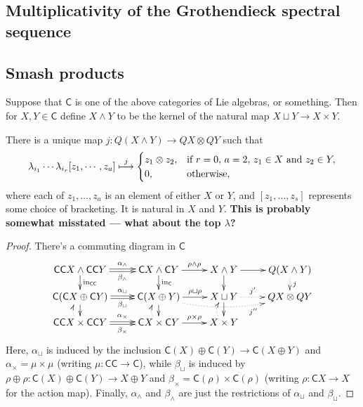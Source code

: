 \documentclass[10pt]{article}
\begin{document}
\begin{Grothendieck Multiplicativity}
\pagebreak
\section{Multiplicativity of the Grothendieck spectral sequence}
\subsection{Smash products}
Suppose that $\mathsf{C}$ is one of the above categories of Lie algebras, or something. Then for $X,Y\in\mathsf{C}$ define $X\wedge Y$ to be the kernel of the natural map $X\sqcup Y\to X\times Y$. 
\begin{prop}
There is a unique map $j:Q(X\wedge Y)\to QX\otimes QY$ such that
\[\lambda_{i_1}\cdots \lambda_{i_r}[z_1,\cdots ,z_a]\overset{j}{\mapsto}\begin{cases}
z_1\otimes z_2,&\textup{if }r=0,\,a=2,\,z_1\in X\textup{ and } z_2\in Y,
\\0,&\textup{otherwise, }
\end{cases}
\]
where each of $z_1,\ldots,z_a$ is an element of either $X$ or $Y$, and $[z_1,\ldots,z_s]$ represents some choice of bracketing. It is natural in $X$ and $Y$. \textbf{This is probably somewhat misstated --- what about the top $\lambda$?}
\end{prop}
\begin{proof}
There's a commuting diagram in $\mathsf{C}$
\[\xymatrix@R=4mm{
\mathsf{C}\mathsf{C}X\wedge \mathsf{C}\mathsf{C}Y
\ar[d]^-{\textup{in}_{\mathsf{C}\mathsf{C}}}
\ar@<.3ex>[r]^-{\alpha_{\wedge }}
\ar@<-.3ex>[r]_-{\beta_{\wedge }}
&%
\mathsf{C}X\wedge \mathsf{C}Y
\ar[d]^-{\textup{in}_{\mathsf{C}}}
\ar[r]^-{\rho\wedge \rho}
&%
X\wedge Y
\ar[d]%
\ar[r]
&
Q(X\wedge Y)
\ar@{..>}[d]^-{j}
\\
\mathsf{C}(\mathsf{C}X\oplus\mathsf{C}Y)
\ar[d]
\ar@<.3ex>[r]^-{\alpha_{\sqcup}}
\ar@<-.3ex>[r]_-{\beta_{\sqcup}}
&%
\mathsf{C}(X\oplus Y)
\ar@{..>}@/_1em/[rr]_-(.85){j''}
\ar[d]
\ar[r]^-{\rho\sqcup \rho}
&%
X\sqcup Y
\ar[d]
\ar@{..>}[r]^-{j'}
&
QX\otimes QY
\\
\mathsf{C}\mathsf{C}X\times \mathsf{C}\mathsf{C}Y
\ar@<.3ex>[r]^-{\alpha_{\times}}
\ar@<-.3ex>[r]_-{\beta_{\times}}
\ar@{..>}@/^.75em/@<0ex>[u]
&%
\mathsf{C}X\times \mathsf{C}Y
\ar[r]^-{\rho\times \rho}
\ar@{..>}@/^.75em/@<0ex>[u]
&%
X\times Y
\ar@{..>}@/^.75em/@<0ex>[u]
}\]
Here, $\alpha_{\sqcup}$ is induced by the inclusion $\mathsf{C}(X)\oplus\mathsf{C}(Y)\to\mathsf{C}(X\oplus Y)$ and $\alpha_{\times}=\mu\times\mu$ (writing $\mu:\mathsf{C}\mathsf{C}\to\mathsf{C}$), while $\beta_{\sqcup}$ is induced by $\rho\oplus\rho:\mathsf{C}(X)\oplus\mathsf{C}(Y)\to X\oplus Y$ and $\beta_{\times}=\mathsf{C}(\rho)\times\mathsf{C}(\rho)$ (writing $\rho:\mathsf{C}X\to X$ for the action map). Finally, $\alpha_{\wedge }$ and $\beta_{\wedge }$ are just the restrictions of $\alpha_{\sqcup }$ and $\beta_{\sqcup }$.


\end{proof}
\end{Grothendieck Multiplicativity}
\end{document}
